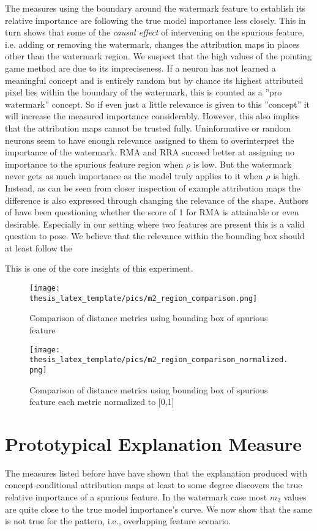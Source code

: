 The measures using the boundary around the watermark feature to establish its relative importance are following the true model importance less closely. 
This in turn shows that some of the \textit{causal effect} of intervening on the spurious feature, i.e. adding or removing the watermark, changes the attribution maps in places other than the watermark region. 
We suspect that the high values of the pointing game method are due to its impreciseness. If a neuron has not learned a meaningful concept and is entirely random but by chance its highest attributed pixel lies within the boundary of the watermark, this is counted as a ''pro watermark'' concept. So if even just a little relevance is given to this ''concept'' it will increase the measured importance considerably. 
However, this also implies that the attribution maps cannot be trusted fully. Uninformative or random neurons seem to have enough relevance assigned to them to overinterpret the importance of the watermark. RMA and RRA succeed better at assigning no importance to the spurious feature region when $\rho$ is low. But the watermark never gets as much importance as the model truly applies to it when $\rho$ is high. Instead, as can be seen from closer inspection of example attribution maps the difference is also expressed through changing the relevance of the shape. Authors of \cite{Arras2022} have been questioning whether the score of 1 for RMA is attainable or even desirable. Especially in our setting where two features are present this is a valid question to pose. We believe that the relevance within the bounding box should at least follow the 

This is one of the core insights of this experiment. 


\begin{figure}[t!]
    \centering
    \texttt{[image: thesis\_latex\_template/pics/m2\_region\_comparison.png]}
    \caption[Region Specific, Comparison of Metrics]{Comparison of distance metrics using bounding box of spurious feature}
    \label{fig:m2_region_comparison}
\end{figure}


\begin{figure}[t!]
    \centering
    \texttt{[image: thesis\_latex\_template/pics/m2\_region\_comparison\_normalized.png]}
    \caption[Region Specific, Comparison of Metrics Normalized]{Comparison of distance metrics using bounding box of spurious feature each metric normalized to [0,1]}
    \label{fig:m2_region_comparison_normalized}
\end{figure}

\section{Prototypical Explanation Measure}
The measures listed before have have shown that the explanation produced with concept-conditional attribution maps at least to some degree discovers the true relative importance of a spurious feature.
In the watermark case most $m_2$ values are quite close to the true model importance's curve.
We now show that the same is not true for the pattern, i.e., overlapping feature scenario.


